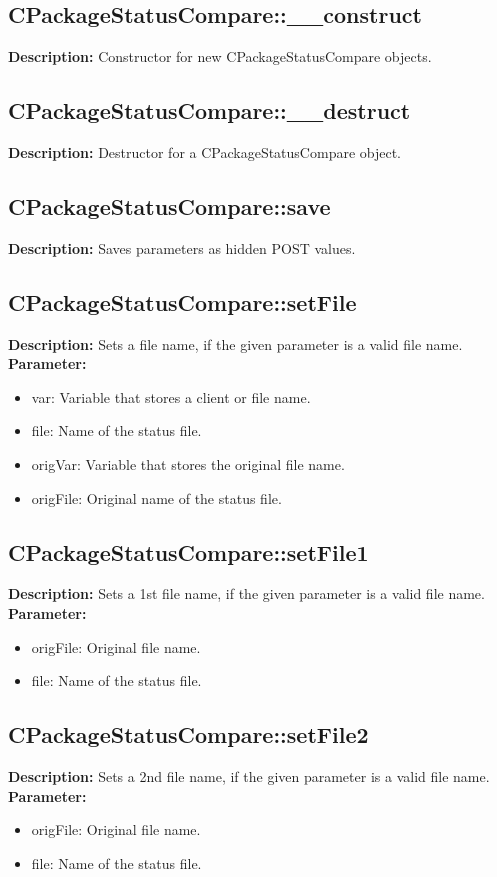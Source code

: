 \subsection{CPackageStatusCompare::\_\_construct}
\textbf{Description:} Constructor for new CPackageStatusCompare objects.\\

\subsection{CPackageStatusCompare::\_\_destruct}
\textbf{Description:} Destructor for a CPackageStatusCompare object.\\

\subsection{CPackageStatusCompare::save}
\textbf{Description:} Saves parameters as hidden POST values.\\

\subsection{CPackageStatusCompare::setFile}
\textbf{Description:} Sets a file name, if the given parameter is a valid file name.\\
\textbf{Parameter:}
\begin{itemize}
\item var: Variable that stores a client or file name.
\item file: Name of the status file.
\item origVar: Variable that stores the original file name.
\item origFile: Original name of the status file.
\end{itemize}

\subsection{CPackageStatusCompare::setFile1}
\textbf{Description:} Sets a 1st file name, if the given parameter is a valid file name.\\
\textbf{Parameter:}
\begin{itemize}
\item origFile: Original file name.
\item file: Name of the status file.
\end{itemize}

\subsection{CPackageStatusCompare::setFile2}
\textbf{Description:} Sets a 2nd file name, if the given parameter is a valid file name.\\
\textbf{Parameter:}
\begin{itemize}
\item origFile: Original file name.
\item file: Name of the status file.
\end{itemize}

